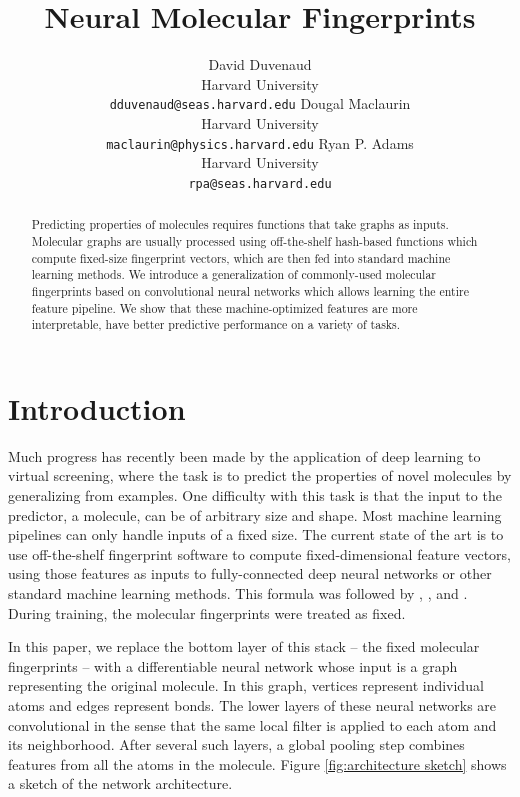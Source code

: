 \documentclass{article}
\title{Neural Molecular Fingerprints}%
\author{
David Duvenaud\\
Harvard University\\
\texttt{dduvenaud@seas.harvard.edu}
\And
Dougal Maclaurin\\
Harvard University\\
\texttt{maclaurin@physics.harvard.edu}
\And
Ryan P. Adams\\
Harvard University\\
\texttt{rpa@seas.harvard.edu}
}
\begin{document}
\maketitle

\begin{abstract}
Predicting properties of molecules requires functions that take graphs as inputs.
Molecular graphs are usually processed using off-the-shelf hash-based functions which compute fixed-size fingerprint vectors, which are then fed into standard machine learning methods.
We introduce a generalization of commonly-used molecular fingerprints based on convolutional neural networks which allows learning the entire feature pipeline.
We show that these machine-optimized features are more interpretable, have better predictive performance on a variety of tasks.
\end{abstract}

\section{Introduction}

Much progress has recently been made by the application of deep learning to virtual screening, where the task is to predict the properties of novel molecules by generalizing from examples.
One difficulty with this task is that the input to the predictor, a molecule, can be of arbitrary size and shape.
Most machine learning pipelines can only handle inputs of a fixed size.
The current state of the art is to use off-the-shelf fingerprint software to compute fixed-dimensional feature vectors, using those features as inputs to fully-connected deep neural networks or other standard machine learning methods.
This formula was followed by \citet{unterthinerdeep}, \citet{dahl2014multi}, and \citet{ramsundar2015massively}.
During training, the molecular fingerprints were treated as fixed.

In this paper, we replace the bottom layer of this stack -- the fixed molecular fingerprints -- with a differentiable neural network whose input is a graph representing the original molecule.
In this graph, vertices represent individual atoms and edges represent bonds.
The lower layers of these neural networks are convolutional in the sense that the same local filter is applied to each atom and its neighborhood.
After several such layers, a global pooling step combines features from all the atoms in the molecule.
Figure \ref{fig:architecture sketch} shows a sketch of the network architecture.
\end{document}
